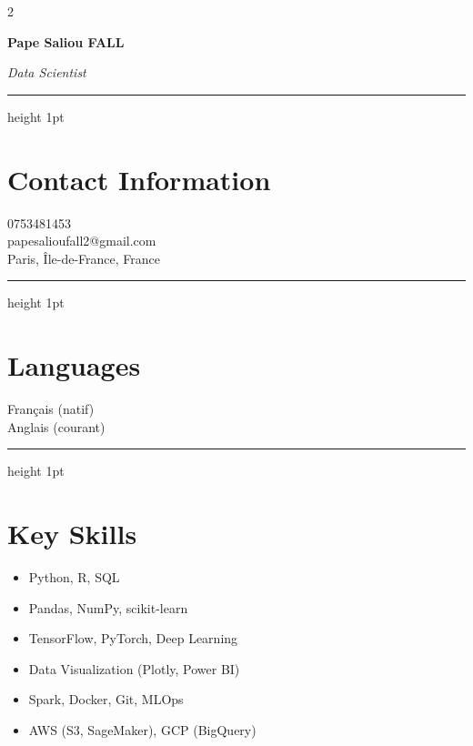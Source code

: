 \documentclass[10pt,letterpaper]{article}
\newcommand{\cvName}[1]{\vspace*{0.3in}\textbf{\LARGE #1}}
\newcommand{\cvHeadline}[1]{\par\smallskip\textit{#1}}
\newcommand{\cvHr}{\vspace{0.5\baselineskip}\hrule height 1pt\color{primary}\vspace{0.7\baselineskip}}
\begin{document}
\begin{paracol}{2}

\begin{leftcolumn}
\begin{center}
\end{center}

\vspace{0.6in}

\cvName{Pape Saliou FALL}
\cvHeadline{Data Scientist}

\cvHr

\section*{Contact Information}
0753481453\\
papesalioufall2@gmail.com\\
Paris, Île-de-France, France

\cvHr

\section*{Languages}
Français (natif)\\
Anglais (courant)

\cvHr

\section*{Key Skills}
\begin{itemize}
  \item Python, R, SQL
  \item Pandas, NumPy, scikit-learn
  \item TensorFlow, PyTorch, Deep Learning
  \item Data Visualization (Plotly, Power BI)
  \item Spark, Docker, Git, MLOps
  \item AWS (S3, SageMaker), GCP (BigQuery)
\end{itemize}


\end{leftcolumn}
\end{paracol}
\end{document}
